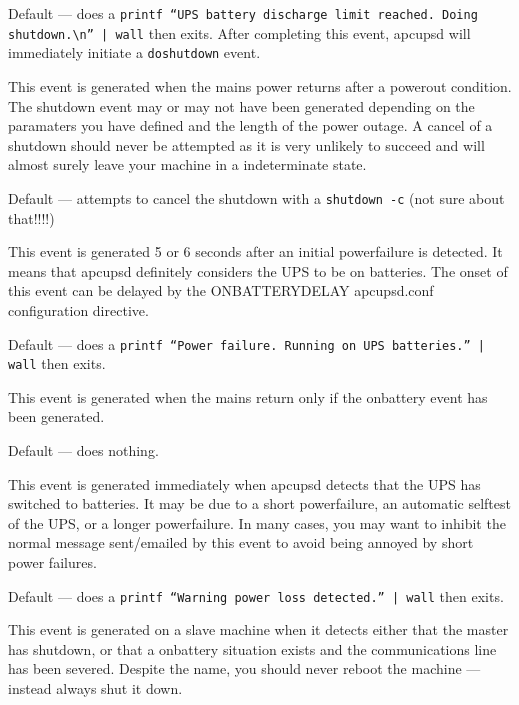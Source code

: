 {{{{{{\begin{description}
Default {---} does a {\tt printf ``UPS battery discharge limit reached. Doing
shutdown.\textbackslash{}n'' | wall} then exits.  After completing this event,
apcupsd will immediately initiate a {\tt doshutdown} event.  

\item [mainsback]
   This event is generated when the mains power returns after a powerout
condition. The shutdown event may or may not have been generated depending on
the paramaters you have defined and the length of the power outage. A cancel
of a shutdown should never be attempted as it is very unlikely to succeed and
will almost surely leave your machine in a indeterminate state.  

Default {---} attempts to cancel the shutdown with a {\tt shutdown -c} (not
sure about that!!!!)  

\item [onbattery]
   This event is generated 5 or 6 seconds after an initial powerfailure is
detected. It means that apcupsd definitely considers the UPS to be on
batteries. The onset of this event can be delayed by the ONBATTERYDELAY
apcupsd.conf configuration directive.  

Default {---} does a {\tt printf ``Power failure. Running on UPS batteries.''
| wall} then exits.  

\item [offbattery]
   This event is generated when the mains return only if the onbattery event has
been generated.  

Default {---} does nothing.  

\item [powerout]
   This event is generated immediately when apcupsd detects that the UPS has
switched to batteries. It may be due to a short powerfailure, an automatic
selftest of the UPS, or a longer powerfailure. In many cases, you may want to
inhibit the normal message sent/emailed by this event to avoid being annoyed
by short power failures.  

Default {---} does a {\tt printf ``Warning power loss detected.'' | wall} then
exits.  

\item [remotedown]
   This event is generated on a slave machine when it detects either that the
master has shutdown, or that a onbattery situation exists and the
communications line has been severed. Despite the name, you should never
reboot the machine {---} instead always shut it down.  


\end{description}}}}}}}
